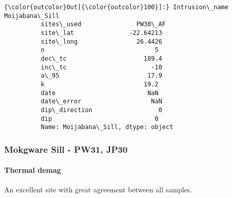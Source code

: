 \documentclass{article}
\begin{document}
            \begin{Verbatim}[commandchars=\\\{\}]
{\color{outcolor}Out[{\color{outcolor}100}]:} Intrusion\_name    Moijabana\_Sill
          sites\_used               PW30\_AF
          site\_lat               -22.64213
          site\_long                26.4426
          n                              5
          dec\_tc                     189.4
          inc\_tc                       -10
          a\_95                        17.9
          k                           19.2
          date                         NaN
          date\_error                   NaN
          dip\_direction                  0
          dip                            0
          Name: Moijabana\_Sill, dtype: object
\end{Verbatim}
        
    \subsubsection{Mokgware Sill - PW31,
JP30}\label{mokgware-sill---pw31-jp30}

    \paragraph{Thermal demag}\label{thermal-demag}

    An excellent site with great agreement between all samples.
\end{document}
